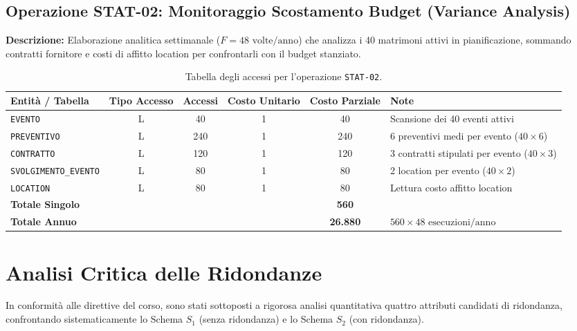 \subsection{Operazione STAT-02: Monitoraggio Scostamento Budget (Variance Analysis)}
\textbf{Descrizione:} Elaborazione analitica settimanale ($F = 48 \text{ volte/anno}$) che analizza i 40 matrimoni attivi in pianificazione, sommando contratti fornitore e costi di affitto location per confrontarli con il budget stanziato.

\begin{table}[h!]
\centering
\small
\begin{tabular}{l c c c c l}
\toprule
\textbf{Entità / Tabella} & \textbf{Tipo Accesso} & \textbf{Accessi} & \textbf{Costo Unitario} & \textbf{Costo Parziale} & \textbf{Note} \\
\midrule
\texttt{EVENTO} & L & 40 & 1 & 40 & Scansione dei 40 eventi attivi \\
\texttt{PREVENTIVO} & L & 240 & 1 & 240 & 6 preventivi medi per evento ($40 \times 6$) \\
\texttt{CONTRATTO} & L & 120 & 1 & 120 & 3 contratti stipulati per evento ($40 \times 3$) \\
\texttt{SVOLGIMENTO\_EVENTO} & L & 80 & 1 & 80 & 2 location per evento ($40 \times 2$) \\
\texttt{LOCATION} & L & 80 & 1 & 80 & Lettura costo affitto location \\
\midrule
\textbf{Totale Singolo} & & & & \textbf{560} & \\
\textbf{Totale Annuo} & & & & \textbf{26.880} & $560 \times 48 \text{ esecuzioni/anno}$ \\
\bottomrule
\end{tabular}
\caption{Tabella degli accessi per l'operazione \texttt{STAT-02}.}
\end{table}

\section{Analisi Critica delle Ridondanze}
In conformità alle direttive del corso, sono stati sottoposti a rigorosa analisi quantitativa quattro attributi candidati di ridondanza, confrontando sistematicamente lo Schema $S_1$ (senza ridondanza) e lo Schema $S_2$ (con ridondanza).


